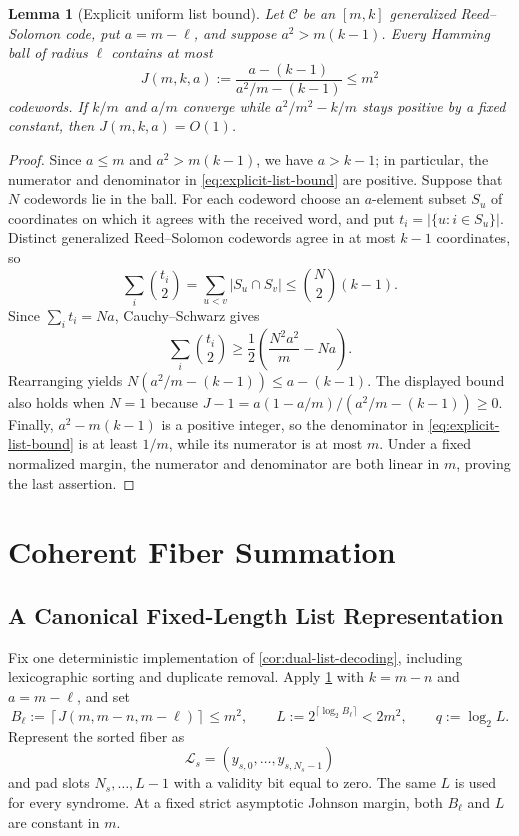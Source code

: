 \documentclass[11pt,letterpaper]{article}
\newtheorem{lemma}[theorem]{Lemma}
\theoremstyle{definition}
\newcommand{\C}{\mathcal{C}}
\newcommand{\Lcal}{\mathcal{L}}
\newcommand{\abs}[1]{\left\lvert #1\right\rvert}
\begin{document}
\begin{lemma}[Explicit uniform list bound]
\label{lem:explicit-list-bound}
Let $\C$ be an $[m,k]$ generalized Reed--Solomon code, put $a=m-\ell$, and suppose $a^2>m(k-1)$.  Every Hamming ball of radius $\ell$ contains at most
\begin{equation}
   J(m,k,a):=
   \frac{a-(k-1)}{a^2/m-(k-1)}\le m^2
   \label{eq:explicit-list-bound}
\end{equation}
codewords.  If $k/m$ and $a/m$ converge while $a^2/m^2-k/m$ stays positive by a fixed constant, then $J(m,k,a)=O(1)$.
\end{lemma}

\begin{proof}
Since $a\le m$ and $a^2>m(k-1)$, we have $a>k-1$; in particular, the numerator and denominator in \cref{eq:explicit-list-bound} are positive.
Suppose that $N$ codewords lie in the ball.  For each codeword choose an $a$-element subset $S_u$ of coordinates on which it agrees with the received word, and put $t_i=\abs{\{u:i\in S_u\}}$.  Distinct generalized Reed--Solomon codewords agree in at most $k-1$ coordinates, so
\[
   \sum_i\binom{t_i}{2}
   =\sum_{u<v}\abs{S_u\cap S_v}
   \le\binom N2(k-1).
\]
Since $\sum_it_i=Na$, Cauchy--Schwarz gives
\[
   \sum_i\binom{t_i}{2}
   \ge\frac12\left(\frac{N^2a^2}{m}-Na\right).
\]
Rearranging yields
$N(a^2/m-(k-1))\le a-(k-1)$.  The displayed bound also holds when $N=1$ because
$J-1=a(1-a/m)/(a^2/m-(k-1))\ge0$.  Finally, $a^2-m(k-1)$ is a positive integer, so the denominator in \cref{eq:explicit-list-bound} is at least $1/m$, while its numerator is at most $m$.  Under a fixed normalized margin, the numerator and denominator are both linear in $m$, proving the last assertion.
\end{proof}

\section{Coherent Fiber Summation}

\subsection{A Canonical Fixed-Length List Representation}

Fix one deterministic implementation of \cref{cor:dual-list-decoding}, including lexicographic sorting and duplicate removal.  Apply \cref{lem:explicit-list-bound} with $k=m-n$ and $a=m-\ell$, and set
\begin{equation}
   B_\ell:=\left\lceil J(m,m-n,m-\ell)\right\rceil\le m^2,
   \qquad
   L:=2^{\lceil\log_2B_\ell\rceil}<2m^2,
   \qquad q:=\log_2L.
   \label{eq:global-L}
\end{equation}
Represent the sorted fiber as
\[
   \Lcal_s=(y_{s,0},\ldots,y_{s,N_s-1})
\]
and pad slots $N_s,\ldots,L-1$ with a validity bit equal to zero.  The same $L$ is used for every syndrome.  At a fixed strict asymptotic Johnson margin, both $B_\ell$ and $L$ are constant in $m$.
\end{document}
